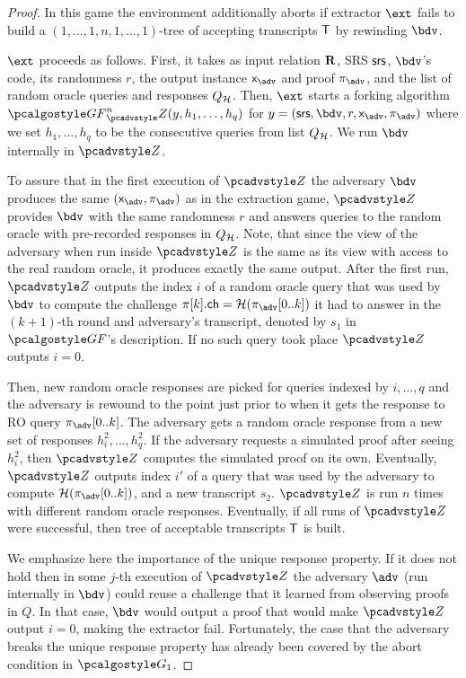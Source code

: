 \begin{proof}
In this game the environment additionally aborts if extractor $\ext$ fails to build a
$(1, \ldots, 1, n, 1, \ldots, 1)$-tree of accepting transcripts $\mathsf{T}$ by rewinding
$\bdv$.

$\ext$ proceeds as follows. First, it takes as input relation $\mathbf{R}$, SRS $\mathsf{srs}$,
$\bdv$'s code, its randomness $r$, the output instance $\inp_{\advse}$ and proof
$\zkproof_{\advse}$, and the list of random oracle queries and responses
$Q_{\mathcal{H}}$. Then, $\ext$ starts a forking algorithm
$\genforking^{n}_\zdv(y,h_1, \ldots, h_q)$ for
$y = (\srs, \bdv, r, \inp_{\advse}, \zkproof_{\advse})$ where we set
$h_1, \ldots, h_q$ to be the consecutive queries from list $Q_{\mathcal{H}}$. We run $\bdv$
internally in $\zdv$.
		
To assure that in the first execution of $\zdv$ the adversary $\bdv$ produces the
same $(\inp_{\advse}, \zkproof_{\advse})$ as in the extraction game, $\zdv$ provides
$\bdv$ with the same randomness $r$ and answers queries to the random oracle with
pre-recorded responses in $Q_{\mathcal{H}}$.
Note, that since the view of the adversary when run inside $\zdv$ is the same as its
view with access to the real random oracle, it produces exactly the same
output. After the first run, $\zdv$ outputs the index $i$ of a random oracle query
that was used by $\bdv$ to compute the challenge
$\zkproof[k].\ch = \ro(\zkproof_{\advse}[0..k])$ it had to answer in the $(k + 1)$-th
round and adversary's transcript, denoted by $s_1$ in $\genforking$'s description. If
no such query took place $\zdv$ outputs $i = 0$.
		
Then, new random oracle responses are picked for queries indexed by $i, \ldots, q$
and the adversary is rewound to the point just prior to when it gets the response to
RO query $\zkproof_{\advse}[0..k]$. The adversary gets a random oracle response from
a new set of responses $h^2_i, \ldots, h^2_q$. If the adversary requests a simulated
proof after seeing $h^2_i$, then $\zdv$ computes the simulated proof on its
own. Eventually, $\zdv$ outputs index $i'$ of a query that was used by the adversary
to compute $\ro(\zkproof_{\advse}[0..k])$, and a new transcript $s_2$. $\zdv$ is run
$n$ times with different random oracle responses.  Eventually, if all runs of $\zdv$
were successful, then tree of acceptable transcripts $\mathsf{T}$ is built.
		
We emphasize here the importance of the unique response property. If it does not hold
then in some $j$-th execution of $\zdv$ the adversary $\adv$ (run internally in
$\bdv$) could reuse a challenge that it learned from observing proofs in $Q$. In that
case, $\bdv$ would output a proof that would make $\zdv$ output $i = 0$, making the
extractor fail. Fortunately, the case that the adversary breaks the unique response
property has already been covered by the abort condition in $\game{1}$.
		

\end{proof}
